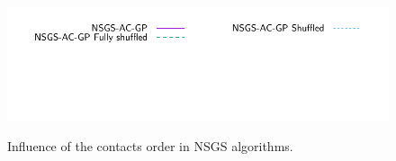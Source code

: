 \begin{figure}
 \\
{\includegraphics[height=\legendheight]{../figure/NSGS/Shuffled/1.0e-08/50/time/profile-Chain_legend.pdf}} 
\caption{Influence of the contacts order in NSGS algorithms.}
\label{fig:NSGS/Shuffled}
\end{figure}

